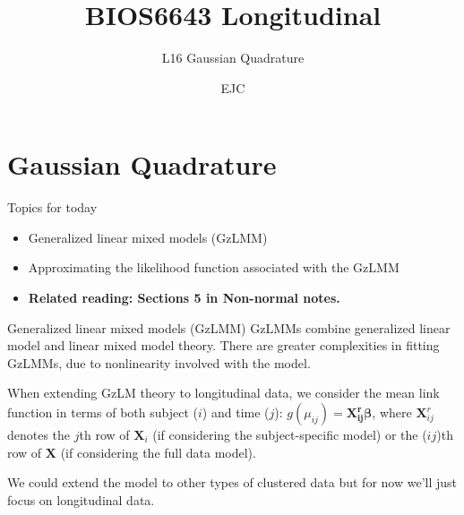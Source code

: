 \documentclass[
  9pt,
  ignorenonframetext,
]{beamer}
\title{BIOS6643 Longitudinal}
\subtitle{L16 Gaussian Quadrature}
\author{EJC}
\date{}
\institute{Department of Biostatistics \& Informatics}
\providecommand{\tightlist}{%
  \setlength{\itemsep}{0pt}\setlength{\parskip}{0pt}}
\begin{document}
\frame{\titlepage}

\begin{frame}[allowframebreaks]
  \tableofcontents[hideallsubsections]
\end{frame}
\hypertarget{gaussian-quadrature}{%
\section{Gaussian Quadrature}\label{gaussian-quadrature}}

\begin{frame}{Topics for today}
\protect\hypertarget{topics-for-today}{}
\begin{itemize}
\item
  Generalized linear mixed models (GzLMM)
\item
  Approximating the likelihood function associated with the GzLMM
\end{itemize}

\vspace{\baselineskip}

\begin{itemize}
\tightlist
\item
  \textbf{Related reading: Sections 5 in Non-normal notes.}
\end{itemize}
\end{frame}

\begin{frame}{Generalized linear mixed models (GzLMM)}
\protect\hypertarget{generalized-linear-mixed-models-gzlmm}{}
GzLMMs combine generalized linear model and linear mixed model theory.
There are greater complexities in fitting GzLMMs, due to nonlinearity
involved with the model.

When extending GzLM theory to longitudinal data, we consider the mean
link function in terms of both subject (\(i\)) and time (\(j\)):
\(g(\mu_{ij} )=\pmb {X_{ij}^r \beta}\), where \(\pmb X_{ij}^r\) denotes
the \(j\)th row of \(\pmb X_i\) (if considering the subject-specific
model) or the (\(ij\))th row of \(\pmb X\) (if considering the full data
model).

We could extend the model to other types of clustered data but for now
we'll just focus on longitudinal data.
\end{frame}
\end{document}
